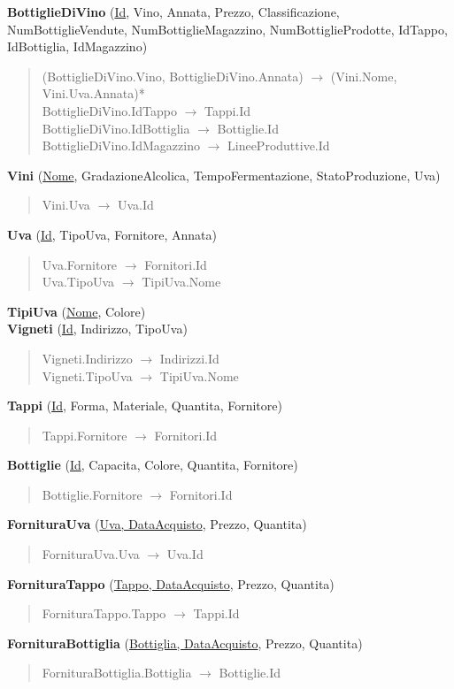 \textbf{BottiglieDiVino} (\underline{Id}, Vino, Annata, Prezzo, Classificazione, NumBottiglieVendute, NumBottiglieMagazzino, NumBottiglieProdotte, IdTappo, IdBottiglia, IdMagazzino)
\begin{verse}
	(BottiglieDiVino.Vino, BottiglieDiVino.Annata) $\to$ (Vini.Nome, Vini.Uva.Annata)*\\
	BottiglieDiVino.IdTappo $\to$ Tappi.Id\\
	BottiglieDiVino.IdBottiglia $\to$ Bottiglie.Id\\
	BottiglieDiVino.IdMagazzino $\to$ LineeProduttive.Id
\end{verse} 
\textbf{Vini} (\underline{Nome}, GradazioneAlcolica, TempoFermentazione, StatoProduzione, Uva)
\begin{verse}
	Vini.Uva $\to$ Uva.Id
\end{verse} 
\textbf{Uva} (\underline{Id}, TipoUva, Fornitore, Annata)
\begin{verse}
	Uva.Fornitore $\to$ Fornitori.Id\\
	Uva.TipoUva $\to$ TipiUva.Nome
\end{verse}
\textbf{TipiUva} (\underline{Nome}, Colore)\\
\textbf{Vigneti} (\underline{Id}, Indirizzo, TipoUva)
\begin{verse}
	Vigneti.Indirizzo $\to$ Indirizzi.Id\\
	Vigneti.TipoUva $\to$ TipiUva.Nome\\
\end{verse} 
\textbf{Tappi} (\underline{Id}, Forma, Materiale, Quantita, Fornitore)
\begin{verse}
	Tappi.Fornitore $\to$ Fornitori.Id
\end{verse}
\textbf{Bottiglie} (\underline{Id}, Capacita, Colore, Quantita, Fornitore)
\begin{verse}
	Bottiglie.Fornitore $\to$ Fornitori.Id
\end{verse}
\textbf{FornituraUva} (\underline{Uva, DataAcquisto}, Prezzo, Quantita)
\begin{verse}
	FornituraUva.Uva $\to$ Uva.Id
\end{verse}
\textbf{FornituraTappo} (\underline{Tappo, DataAcquisto}, Prezzo, Quantita)
\begin{verse}
	FornituraTappo.Tappo $\to$ Tappi.Id
\end{verse} 
\textbf{FornituraBottiglia} (\underline{Bottiglia, DataAcquisto}, Prezzo, Quantita)
\begin{verse}
	FornituraBottiglia.Bottiglia $\to$ Bottiglie.Id
\end{verse} 
